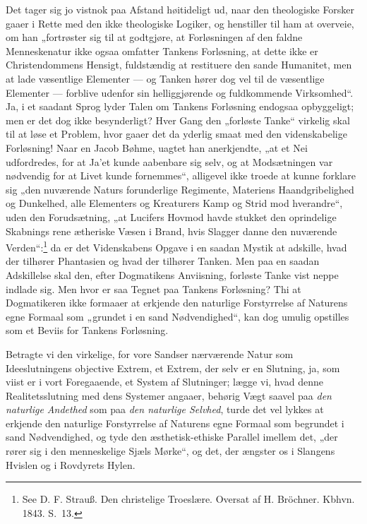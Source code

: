 \documentclass[12pt]{book}
\newcommand{\opage}[1]{\marginnote{\footnotesize\textit{[#1]}}}
\begin{document}
Det tager sig jo vistnok paa Afstand høitideligt ud, naar den theologiske Forsker gaaer i Rette med den ikke theologiske Logiker, og henstiller til ham at overveie, om han „fortrøster sig til at godtgjøre, at Forløsningen af den faldne Menneskenatur ikke ogsaa omfatter Tankens Forløsning, at dette ikke er Christendommens Hensigt, fuldstændig at restituere den sande Humanitet, men at lade væsentlige Elementer --- og Tanken hører dog vel til de væsentlige Elementer --- forblive udenfor sin helliggjørende og fuldkommende Virksomhed“. Ja, i et saadant Sprog lyder Talen om Tankens Forløsning endogsaa opbyggeligt; men er det dog ikke besynderligt? Hver Gang den „forløste Tanke“ virkelig skal til at løse et Problem, hvor gaaer det da yderlig smaat med den videnskabelige Forløsning! Naar en Jacob Bøhme, uagtet han anerkjendte, „at et Nei udfordredes, for at Ja'et kunde aabenbare sig selv, og at Modsætningen var nødvendig for at Livet kunde fornemmes“, alligevel ikke troede at kunne forklare sig „den nuværende Naturs forunderlige Regimente, Materiens Haandgribelighed og
\opage{452}Dunkelhed, alle Elementers og Kreaturers Kamp og Strid mod hverandre“, uden den Forudsætning, „at Lucifers Hovmod havde stukket den oprindelige Skabnings rene ætheriske Væsen i Brand, hvis Slagger danne den nuværende Verden“:\footnote{See D. F. Strauß. Den christelige Troeslære. Oversat af H. Bröchner. Kbhvn. 1843. S.~13.}%
{} da er det Videnskabens Opgave i en saadan Mystik at adskille, hvad der tilhører Phantasien og hvad der tilhører Tanken. Men paa en saadan Adskillelse skal den, efter Dogmatikens Anviisning, forløste Tanke vist neppe indlade sig. Men hvor er saa Tegnet paa Tankens Forløsning? Thi at Dogmatikeren ikke formaaer at erkjende den naturlige Forstyrrelse af Naturens egne Formaal som „grundet i en sand Nødvendighed“, kan dog umulig opstilles som et Beviis for Tankens Forløsning.

Betragte vi den virkelige, for vore Sandser nærværende Natur som Ideeslutningens objective Extrem, et Extrem, der selv er en Slutning, ja, som viist er i vort Foregaaende, et System af Slutninger; lægge vi, hvad denne Realitetsslutning med dens Systemer angaaer, behørig Vægt saavel paa \emph{den naturlige Andethed} som paa \emph{den naturlige Selvhed}, turde det vel lykkes at erkjende den naturlige Forstyrrelse af Naturens egne Formaal som begrundet i sand Nødvendighed, og tyde den æsthetisk-ethiske Parallel imellem det, „der rører sig i den menneskelige Sjæls Mørke“, og det, der ængster os i Slangens Hvislen og i Rovdyrets Hylen.
\end{document}
